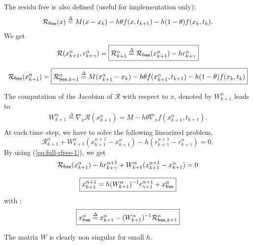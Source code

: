 The residu free is also defined (useful for implementation only):
\[\mathcal R _{{\sf free}}(x) \stackrel{\Delta}{=}  M(x - x_{k}) -h\theta f( x , t_{k+1}) - h(1-\theta)f(x_k,t_k).\]
We get
\begin{equation}
  \mathcal R (x^{\alpha}_{k+1},r^{\alpha}_{k+\gamma}) = \fbox{$\mathcal R^{\alpha}_{k+1} \stackrel{\Delta}{=}  \mathcal R_{{\sf free}}(x^{\alpha}_{k+1} )  - h r^{\alpha}_{k+\gamma}$}\label{eq:full-rfree-1}
\end{equation}

\[  \mathcal R
_{{\sf free}}(x^{\alpha}_{k+1} )=\fbox{$ \mathcal R _{{\sf free}, k+1} ^{\alpha} \stackrel{\Delta}{=}  M(x^{\alpha}_{k+1} - x_{k}) -h\theta f( x^{\alpha}_{k+1} , t_{k+1}) - h(1-\theta)f(x_k,t_k)$}\]

The computation of the Jacobian of $\mathcal R$ with respect to $x$, denoted by $   W^{\alpha}_{k+1}$ leads to
\begin{equation}
   \label{eq:full-NL9}
   \begin{array}{l}
    W^{\alpha}_{k+1} \stackrel{\Delta}{=} \nabla_{x} \mathcal R (x^{\alpha}_{k+1})= M - h  \theta \nabla_{x} f(  x^{\alpha}_{k+1}, t_{k+1} ).\\
 \end{array}
\end{equation}
At each time--step, we have to solve the following linearized problem,
\begin{equation}
   \label{eq:full-NL10}
    \mathcal R^{\alpha}_{k+1} + W^{\alpha}_{k+1} (x^{\alpha+1}_{k+1} -
    x^{\alpha}_{k+1}) - h  (r^{\alpha+1}_{k+\gamma} - r^{\alpha}_{k+\gamma} )  =0 ,
\end{equation}
By using (\ref{eq:full-rfree-1}), we get
\begin{equation}
  \label{eq:full-rfree-2}
  \mathcal R _{{\sf free}}(x^{\alpha}_{k+1})  - h  r^{\alpha+1}_{k+\gamma}   + W^{\alpha}_{k+1} (x^{\alpha+1}_{k+1} -
    x^{\alpha}_{k+1})  =0
\end{equation}

{
  \begin{equation}
    \boxed{ x^{\alpha+1}_{k+1} = h(W^{\alpha}_{k+1})^{-1}r^{\alpha+1}_{\gamma+1} +x^\alpha_{{\sf free}}}
  \end{equation}
}
with :
\begin{equation}
  \boxed{x^\alpha_{{\sf free}}\stackrel{\Delta}{=}x^{\alpha}_{k+1}-(W^{\alpha}_{k+1})^{-1}\mathcal R_{{\sf free},k+1}^{\alpha} \label{eq:full-rfree-12}}
\end{equation}

The matrix $W$ is clearly non singular for small $h$.

